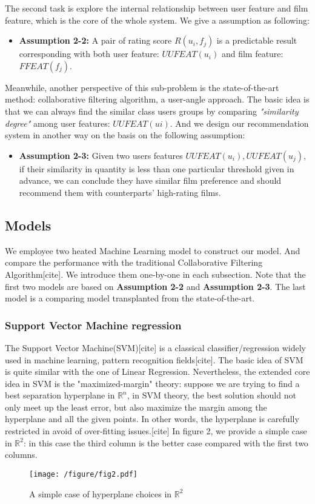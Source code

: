 The second task is explore the internal relationship between user feature and film feature, which is the core of the whole system. We give a assumption as following:
\begin{itemize}
\item \textbf{Assumption 2-2:} A pair of rating score $R(u_{i},f_{j})$ is a predictable result corresponding with both user feature: $UUFEAT(u_{i})$ and film feature: $FFEAT(f_{j})$. 
\end{itemize} 

Meanwhile, another perspective of this sub-problem is the state-of-the-art method: collaborative filtering algorithm, a user-angle approach\cite{linden2003amazon,breese1998empirical}. The basic idea is that we can always find the similar class users groups by comparing \textit{"similarity degree"} among user features: $UUFEAT(u{i})$. And we design our recommendation system in another way on the basis on the following assumption:
\begin{itemize}
\item \textbf{Assumption 2-3:} Given two users features $UUFEAT(u_{i}), UUFEAT(u_{j})$, if their similarity in quantity is less than one particular threshold given in advance, we can conclude they have similar film preference and should recommend them with counterparts' high-rating films.
\end{itemize}

\subsection{Models}
We employee two heated Machine Learning model to construct our model. And compare the performance with the traditional Collaborative Filtering Algorithm[cite]. We introduce them one-by-one in each subsection. Note that the first two models are based on \textbf{Assumption 2-2} and \textbf{Assumption 2-3}. The last model is a comparing model transplanted from the state-of-the-art.

\subsubsection{Support Vector Machine regression}
The Support Vector Machine(SVM)[cite] is a classical classifier/regression widely used in machine learning, pattern recognition fields[cite]. The basic idea of SVM is quite similar with the one of Linear Regression. Nevertheless, the extended core idea in SVM is the "maximized-margin" theory: suppose we are trying to find a best separation hyperplane in $\mathbb{R}^{n}$, in SVM theory, the best solution should not only meet up the least error, but also maximize the margin among the hyperplane and all the given points. In other words, the hyperplane is carefully restricted in avoid of over-fitting issues.[cite]
In figure 2, we provide a simple case in $\mathbb{R}^{2}$: in this case the third column is the better case compared with the first two columns. 
\begin{figure}[htbp]
\centering
\texttt{[image: /figure/fig2.pdf]}
\caption{A simple case of hyperplane choices in $\mathbb{R}^{2}$} \label{fig:2}
\end{figure}


